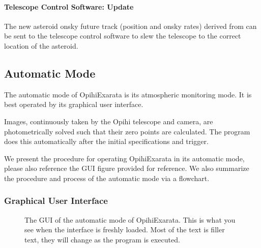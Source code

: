 \documentclass[letterpaper,11pt,english]{sphinxmanual}
\begin{document}
\paragraph{Telescope Control Software: Update}
\label{\detokenize{user/manual_mode:telescope-control-software-update}}
\sphinxAtStartPar
The new asteroid on\sphinxhyphen{}sky future track (position and on\sphinxhyphen{}sky rates) derived from
{\hyperref[\detokenize{user/manual_mode:user-manual-procedure-asteroid-on-sky-future-track}]{}} can be sent to the
telescope control software to slew the telescope to the correct location of
the asteroid.

\sphinxstepscope


\subsection{Automatic Mode}
\label{\detokenize{user/automatic_mode:automatic-mode}}\label{\detokenize{user/automatic_mode:user-automatic-mode}}\label{\detokenize{user/automatic_mode::doc}}
\sphinxAtStartPar
The automatic mode of OpihiExarata is its atmospheric monitoring mode. It is
best operated by its graphical user interface.

\sphinxAtStartPar
Images, continuously taken by the Opihi telescope and camera, are
photometrically solved such that their zero points are calculated. The
program does this automatically after the initial specifications and trigger.

\sphinxAtStartPar
We present the procedure for operating OpihiExarata in its automatic mode,
please also reference the GUI figure provided for reference. We also summarize
the procedure and process of the automatic mode via a flowchart.


\subsubsection{Graphical User Interface}
\label{\detokenize{user/automatic_mode:graphical-user-interface}}
\begin{figure}[htbp]
\centering
\capstart

\noindent{}
\caption{The GUI of the automatic mode of OpihiExarata. This is what you see when
the interface is freshly loaded. Most of the text is filler text, they will
change as the program is executed.}\label{\detokenize{user/automatic_mode:id1}}\label{\detokenize{user/automatic_mode:figure-automatic-mode-gui}}\end{figure}
\end{document}
